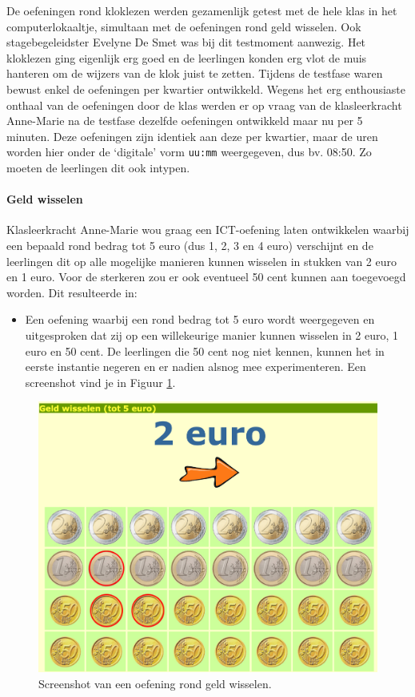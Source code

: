 \documentclass[a4paper,11pt]{article}
\theoremstyle{definition}
\begin{document}
\begin{itemize}
\begin{itemize}
\noindent De oefeningen rond kloklezen werden gezamenlijk getest met de hele klas in het 
computerlokaaltje, simultaan met de oefeningen rond geld wisselen. Ook stagebegeleidster Evelyne De Smet was bij dit testmoment aanwezig. 
Het kloklezen ging eigenlijk erg goed en de leerlingen konden erg vlot de muis 
hanteren om de wijzers van de klok juist te zetten. Tijdens de testfase waren 
bewust enkel de oefeningen per kwartier ontwikkeld. Wegens het erg enthousiaste 
onthaal van de oefeningen door de klas werden er op vraag van de klasleerkracht Anne-Marie na de testfase dezelfde oefeningen ontwikkeld 
maar nu per 5 minuten. Deze oefeningen zijn identiek aan deze per kwartier, maar de uren worden 
hier onder de `digitale' vorm \texttt{uu:mm} weergegeven, dus bv. 08:50. Zo 
moeten de leerlingen dit ook intypen.

\paragraph{Geld wisselen} Klasleerkracht Anne-Marie wou graag een ICT-oefening 
laten ontwikkelen waarbij een bepaald rond bedrag tot 5 euro (dus 1, 2, 3 en 4 euro) verschijnt en de leerlingen dit op alle mogelijke manieren kunnen
wisselen in stukken van 2 euro en 1 euro. Voor de sterkeren zou er ook eventueel 
50 cent kunnen aan toegevoegd worden. Dit resulteerde in:
\begin{itemize}
  \item Een oefening waarbij een rond bedrag tot 5 euro wordt weergegeven en uitgesproken
  dat zij op een willekeurige manier kunnen wisselen in 2 euro, 1 euro en 50 
  cent. De leerlingen die 50 cent nog niet kennen, kunnen het in eerste 
  instantie negeren en er nadien alsnog mee experimenteren. Een screenshot vind 
  je in Figuur \ref{geld}.
  \end{itemize}
\begin{figure}[h!]
  \centering
  \includegraphics[scale=0.15]{geld.jpg}\caption{Screenshot van een oefening rond geld wisselen.}\label{geld}
\end{figure}


\end{itemize}
\end{itemize}
\end{document}
